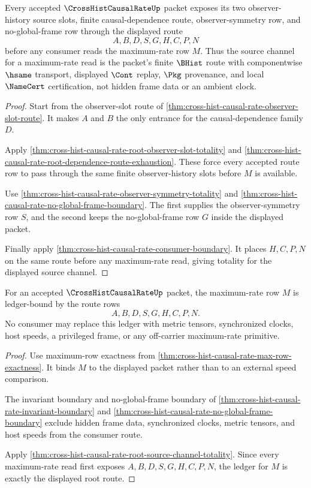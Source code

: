 \begin{theorem}
\label{thm:cross-hist-causal-rate-root-source-channel-totality}
Every accepted $\CrossHistCausalRateUp$ packet exposes its two observer-history source slots, finite causal-dependence route, observer-symmetry row, and no-global-frame row through the displayed route
$$
A,B,D,S,G,H,C,P,N
$$
before any consumer reads the maximum-rate row $M$. Thus the source channel for a maximum-rate read is the packet's finite $\BHist$ route with componentwise $\hsame$ transport, displayed $\Cont$ replay, $\Pkg$ provenance, and local $\NameCert$ certification, not hidden frame data or an ambient clock.
\end{theorem}
\begin{proof}
Start from the observer-slot route of \autoref{thm:cross-hist-causal-rate-observer-slot-route}. It makes $A$ and $B$ the only entrance for the causal-dependence family $D$.

Apply \autoref{thm:cross-hist-causal-rate-root-observer-slot-totality} and \autoref{thm:cross-hist-causal-rate-root-dependence-route-exhaustion}. These force every accepted route row to pass through the same finite observer-history slots before $M$ is available.

Use \autoref{thm:cross-hist-causal-rate-observer-symmetry-totality} and \autoref{thm:cross-hist-causal-rate-no-global-frame-boundary}. The first supplies the observer-symmetry row $S$, and the second keeps the no-global-frame row $G$ inside the displayed packet.

Finally apply \autoref{thm:cross-hist-causal-rate-consumer-boundary}. It places $H,C,P,N$ on the same route before any maximum-rate read, giving totality for the displayed source channel.
\end{proof}

\begin{theorem}
\label{thm:cross-hist-causal-rate-max-bound-ledger}
For an accepted $\CrossHistCausalRateUp$ packet, the maximum-rate row $M$ is ledger-bound by the route rows
$$
A,B,D,S,G,H,C,P,N.
$$
No consumer may replace this ledger with metric tensors, synchronized clocks, host speeds, a privileged frame, or any off-carrier maximum-rate primitive.
\end{theorem}
\begin{proof}
Use maximum-row exactness from \autoref{thm:cross-hist-causal-rate-max-row-exactness}. It binds $M$ to the displayed packet rather than to an external speed comparison.

The invariant boundary and no-global-frame boundary of \autoref{thm:cross-hist-causal-rate-invariant-boundary} and \autoref{thm:cross-hist-causal-rate-no-global-frame-boundary} exclude hidden frame data, synchronized clocks, metric tensors, and host speeds from the consumer route.

Apply \autoref{thm:cross-hist-causal-rate-root-source-channel-totality}. Since every maximum-rate read first exposes $A,B,D,S,G,H,C,P,N$, the ledger for $M$ is exactly the displayed root route.
\end{proof}

